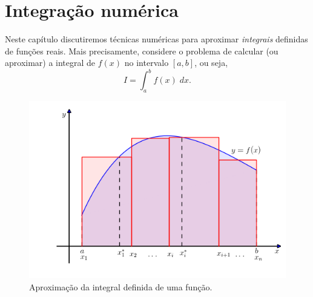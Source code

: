 
%

\chapter{Integração numérica} \label{cap:integracao}

Neste capítulo discutiremos técnicas numéricas para aproximar \emph{integrais} definidas de funções reais. Mais precisamente, considere o problema de calcular (ou aproximar) a integral de $f(x)$ no intervalo $[a,b]$, ou seja,
\begin{equation}
 I = \int_a^b f(x) \;dx.
\end{equation}

\begin{figure}
  \centering
  \includegraphics[scale=1.0]{./cap_integracao/pics/Somas_de_Riemann/Somas_de_Riemann}
  \caption{Aproximação da integral definida de uma função.}
  \label{fig:Somas_de_Riemann}
\end{figure}

